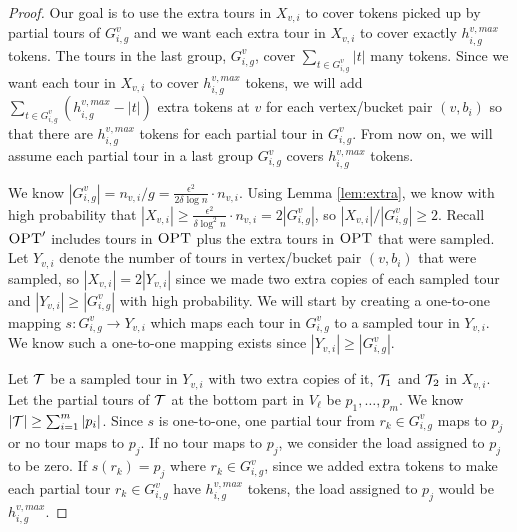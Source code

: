 \documentclass[twoside,leqno]{article}
\newcommand{\calT}{{\cal T}}
\newcommand{\OPT}{\mbox{\sc OPT}}
\newcommand{\eps}{\epsilon}
\begin{document}
\begin{proof}
Our goal is to use the extra tours in $X_{v,i}$ to cover tokens picked up by partial tours of $G^v_{i,g}$ and we want each extra tour in $X_{v,i}$ to cover exactly $h^{v,max}_{i,g}$ tokens. The tours in the last group, $G^v_{i,g}$, cover $\sum_{t \in G^v_{i,g}} |t|$ many tokens. Since we want each tour in $X_{v,i}$ to cover $h^{v,max}_{i,g}$ tokens, we will add $\sum_{t \in G^v_{i,g}} (h^{v,max}_{i,g} - |t|)$ extra tokens at $v$ for each vertex/bucket pair $(v,b_i)$ so that there are $h^{v,max}_{i,g}$ tokens for each partial tour in $G^v_{i,g}$.  From now on, we will assume each partial tour in a last group $G^v_{i,g}$ covers $h^{v,max}_{i,g}$ tokens.

We know $|G^v_{i,g}| = n_{v,i}/g = \frac{\eps^2 }{2\delta \log n} \cdot n_{v,i}$. Using Lemma \ref{lem:extra}, we know with high probability that $|X_{v,i}| \ge \frac{\eps^2 }{\delta\log^2 n} \cdot n_{v,i} =2 |G^v_{i,g}|$, so $|X_{v,i}|/|G^v_{i,g}| \ge 2$. Recall $\OPT'$ includes tours in $\OPT$ plus the extra tours in $\OPT$ that were sampled.  Let $Y_{v,i}$ denote the number of tours in vertex/bucket pair $(v,b_i)$ that were sampled, so $|X_{v,i}| = 2|Y_{v,i}|$ since we made two extra copies of each sampled tour and $|Y_{v,i}|\ge |G^v_{i,g}|$ with high probability. We will start by creating a one-to-one mapping $s : G^v_{i,g} \rightarrow Y_{v,i}$ which maps each tour in $G^v_{i,g}$ to a sampled tour in $Y_{v,i}$. We know such a one-to-one mapping exists since $|Y_{v,i}|\ge |G^v_{i,g}|$. 

Let $\calT$ be a sampled tour in $Y_{v,i}$ with two extra copies of it, $\calT_1$ and $\calT_2$ in $X_{v,i}$. Let the partial tours of $\calT$ at the bottom part in $V_\ell$ be $p_1, \ldots, p_m$. We know $|\calT| \ge \sum_{i = 1}^m |p_i|$. Since $s$ is one-to-one, one partial tour from $r_k \in G^v_{i,g}$ maps to $p_j$ or no tour maps to $p_j$. If no tour maps to $p_j$, we consider the load assigned to $p_j$ to be zero. If $s(r_k) = p_j$ where  $r_k \in G^v_{i,g}$, since we added extra tokens to make each partial tour $r_k \in G^v_{i,g}$ have $h^{v,max}_{i,g}$ tokens, the load assigned to $p_j$ would be $h^{v,max}_{i,g}$. 


\end{proof}
\end{document}
